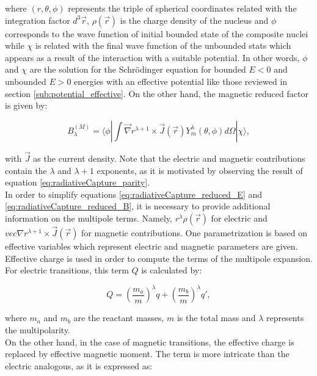 \documentclass[openany]{book}
\begin{document}
where $(r, \theta, \phi)$ represents the triple of spherical coordinates related with the integration factor $d^3 \vec r $,  $\rho(\vec r)$ is the charge density of the nucleus and
$\phi$ corresponds to the wave function of initial bounded state of the composite nuclei while $\chi$ is related with the final wave function of the unbounded stats which appears as a result of the interaction with a suitable potential.  In other words, $\phi$ and $\chi$ are the solution for the Schrödinger equation for bounded $E < 0 $ and unbounded $E > 0$ energies with an effective potential like those reviewed in section \ref{sub:potential_effective}. On the other hand, the magnetic reduced factor is given by: 

\begin{equation} \label{eq:radiativeCapture_reduced_B}
	B^{(M)}_{\lambda} =  \langle  \phi  |  \int  \vec \nabla r^{\lambda+1} \times \vec J (\vec r) Y^{\lambda}_{m} (\theta, \phi) d \Omega |   \chi  \rangle,  
\end{equation}

with $\vec J$ as the current density.  Note that the electric and magnetic contributions contain the $\lambda$ and $\lambda + 1$ exponents, as it is motivated by observing the result of equation \ref{eq:radiativeCapture_parity}. \\

In order to simplify equations \ref{eq:radiativeCapture_reduced_E} and 
\ref{eq:radiativeCapture_reduced_B}, it is necessary to provide additional information on the multipole terms. Namely, $  r^\lambda \rho(\vec r)$ for electric and $vec \nabla r^{\lambda+1} \times \vec J (\vec r)$ for magnetic contributions. One parametrization is based on effective variables which represent electric and magnetic parameters are given. Effective charge is used in order to compute the terms of the multipole expansion. For electric transitions, this term $Q$ is calculated by:

\begin{equation} \label{eq:radiativeCapture_Electric_charge}
	Q =  \left(\frac{m_a}{m}\right)^{\lambda}q + \left(\frac{m_b}{m}\right)^{\lambda}q',
\end{equation}

where $m_a$ and $m_b$ are the reactant masses, $m$ is the total mass and $\lambda$ represents the multipolarity. \\

On the other hand, in the case of magnetic transitions, the effective charge is replaced by effective magnetic moment.
The term is more intricate than the electric analogous, as it is expressed as: 
\end{document}
